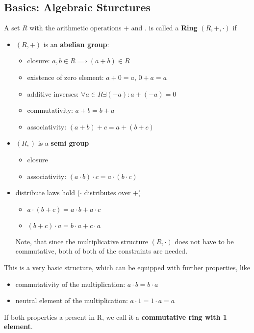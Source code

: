 
\subsection{Basics: Algebraic Sturctures}

\begin{definition}
	A set $R$ with the arithmetic operations $+$ and $.$ is called a \textbf{Ring} $(R,+,\cdot)$ if
	\begin{itemize}
	\item $(R,+)$ is an \textbf{abelian group}:
		\begin{itemize}
		\item closure: $a,b \in R \implies (a+b)\in R $
		\item existence of zero element: $a+0=a$, $0+a=a$
		\item additive inverses: $\forall a \in R \exists (-a) : a + (-a) = 0$
		\item commutativity: $a+b=b+a$
		\item associativity: $(a+b)+c=a+(b+c)$
		\end{itemize}
	\item $(R, )$ is a \textbf{semi group}
		\begin{itemize}
			\item closure 
			\item associativity: $(a \cdot b)\cdot c=a \cdot (b \cdot c)$
		\end{itemize}
	\item distribute laws hold ($\cdot$ distributes over $+$)
		\begin{itemize}
			\item $a \cdot (b+c) = a \cdot b + a \cdot c $ 
			\item $(b+c) \cdot a = b \cdot a + c \cdot a $
		\end{itemize}
		Note, that since the multiplicative structure $(R, \cdot)$ does not have to be commutative, both of both of the constraints are needed.
	\end{itemize}
\end{definition}

This is a very basic structure, which can be equipped with further properties, like
\begin{itemize}
	\item commutativity of the multiplication: $a \cdot b = b \cdot a$
	\item neutral element of the multiplication: $a \cdot 1 = 1 \cdot a = a$
\end{itemize}
If both properties a present in R, we call it a \textbf{commutative ring with 1 element}.

